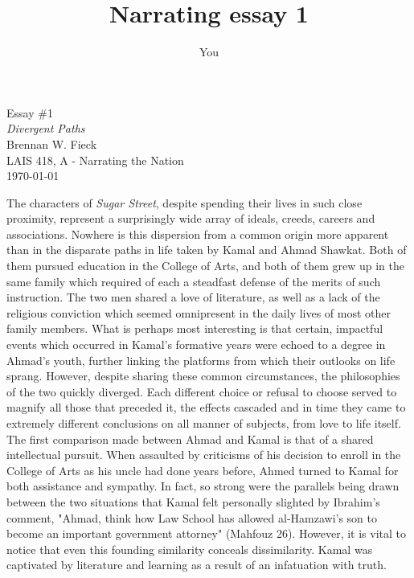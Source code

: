 \documentclass[a4paper,12pt]{article}
\title{Narrating essay 1}
\author{You}
\providecommand{\mhfz}[1]{(Mahfouz #1)}
\begin{document}
  \begin{titlepage}
    \vspace*{\fill}
    \begin{center}
      {\Huge Essay \#1}\\
      {\LARGE \emph{Divergent Paths}}\\[0.4cm]
      {\Large Brennan W. Fieck}\\
      {\large LAIS 418, A - Narrating the Nation}\\
      \today
    \end{center}
    \vspace*{\fill}
  \end{titlepage}
  
The characters of \textit{Sugar Street}, despite spending their lives in such
close proximity, represent a surprisingly wide array of ideals, creeds, careers
and associations. Nowhere is this dispersion from a common origin more apparent
than in the disparate paths in life taken by Kamal and Ahmad Shawkat. Both of
them pursued education in the College of Arts, and both of them grew up in the
same family which required of each a steadfast defense of the merits of such
instruction. The two men shared a love of literature, as well as a lack of the
religious conviction which seemed omnipresent in the daily lives of most other family
members. What is perhaps most interesting is that certain, impactful events which occurred in
Kamal's formative years were echoed to a degree in Ahmad's youth, further
linking the platforms from which their outlooks on life sprang. However,
despite sharing these common circumstances, the philosophies of the two quickly
diverged. Each different choice or refusal to choose served to magnify all those that preceded
it, the effects cascaded and in time they came to extremely different
conclusions on all manner of subjects, from love to life itself.\\
\indent The first comparison made between Ahmad and Kamal is that of a shared
intellectual pursuit. When assaulted by criticisms of his decision to enroll in
the College of Arts as his uncle had done years before, Ahmed turned to Kamal
for both assistance and sympathy. In fact, so strong were the parallels being
drawn between the two situations that Kamal felt personally slighted by
Ibrahim's comment, "Ahmad, think how Law School has allowed al-Hamzawi's son to
become an important government attorney" \mhfz{26}. However, it is vital to
notice that even this founding similarity conceals dissimilarity. Kamal was
captivated by literature and learning as a result of an infatuation with truth.
\end{document}
